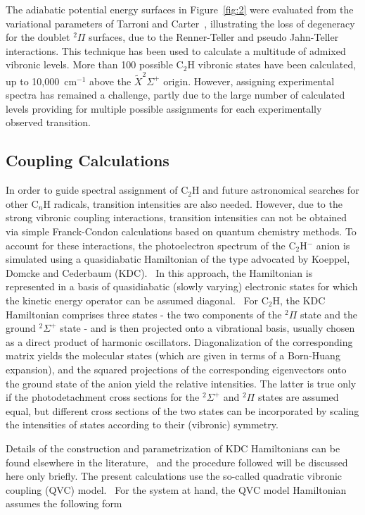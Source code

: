 \documentclass[aip,graphicx]{revtex4-1}
\begin{document}
The adiabatic potential energy surfaces in Figure~\ref{fig:2} were evaluated from the variational parameters of Tarroni and Carter~\cite{tar03}, illustrating the loss of degeneracy for the doublet $^2\Pi$ surfaces, due to the Renner-Teller and pseudo Jahn-Teller interactions. This technique has been used to calculate a multitude of admixed vibronic levels. More than 100 possible C$_2$H vibronic states have been calculated, up to 10,000~cm$^{-1}$ above the $\tilde{X} ^2\Sigma^+$ origin. However, assigning experimental spectra has remained a challenge, partly due to the large number of calculated levels providing for multiple possible assignments for each experimentally observed transition.


\subsection{Coupling Calculations}
In order to guide spectral assignment of C$_2$H and future astronomical searches for other C$_n$H radicals, transition intensities are also needed. However, due to the strong vibronic coupling interactions, transition intensities can not be obtained via simple Franck-Condon calculations based on quantum chemistry methods. To account for these interactions, the photoelectron spectrum of the C$_2$H$^-$ anion is simulated using a quasidiabatic Hamiltonian of the type advocated by Koeppel, Domcke and Cederbaum (KDC).~\cite{kou84,dom81} In this approach, the Hamiltonian is represented in a basis of quasidiabatic (slowly varying) electronic  states for which the kinetic energy operator can be assumed diagonal.~\cite{pac93} For C$_2$H, the KDC Hamiltonian comprises three states - the two components of the $^2\Pi$ state and the ground $^2\Sigma^+$ state - and is then projected onto a vibrational basis, usually chosen as a direct product of harmonic oscillators. Diagonalization of the corresponding matrix yields the molecular states (which are given in terms of a Born-Huang expansion), and the squared projections of the corresponding eigenvectors onto the ground state of the anion yield the relative intensities. The latter is true only if the photodetachment cross sections for the $^2\Sigma^+$ and $^2\Pi$ states are assumed equal, but different cross sections of the two states can be incorporated by scaling the intensities of states according to their (vibronic) symmetry.~\cite{sta11} 

Details of the construction and parametrization of KDC Hamiltonians can be found elsewhere in the literature,~\cite{sta21,ich06,ich08,ich09,wei17} and the procedure followed will be discussed here only briefly. The present calculations use the so-called quadratic vibronic coupling (QVC) model.~\cite{ich06} For the system at hand, the QVC model Hamiltonian  assumes the following form
\end{document}
